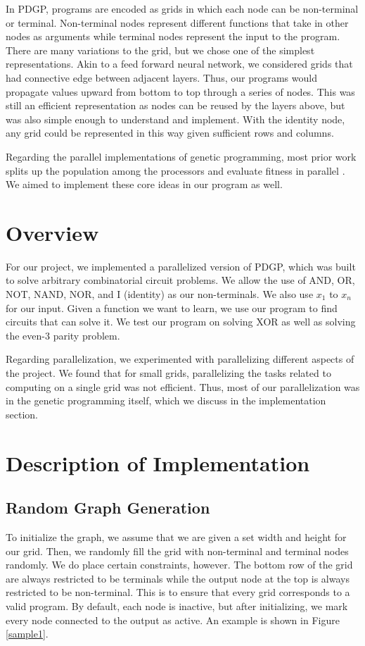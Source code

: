 \documentclass{article}
\begin{document}
	In PDGP, programs are encoded as grids in which each node can be non-terminal or terminal. Non-terminal nodes represent different functions that take in other nodes as arguments while terminal nodes represent the input to the program. There are many variations to the grid, but we chose one of the simplest representations. Akin to a feed forward neural network, we considered grids that had connective edge between adjacent layers. Thus, our programs would propagate values upward from bottom to top through a series of nodes. This was still an efficient representation as nodes can be reused by the layers above, but was also simple enough to understand and implement. With the identity node, any grid could be represented in this way given sufficient rows and columns.
	
	Regarding the parallel implementations of genetic programming, most prior work splits up the population among the processors and evaluate fitness in parallel \cite{b4}. We aimed to implement these core ideas in our program as well.
	
	
	\section{Overview}
	For our project, we implemented a parallelized version of PDGP, which was built to solve arbitrary combinatorial circuit problems. We allow the use of AND, OR, NOT, NAND, NOR, and I (identity) as our non-terminals. We also use $x_1$ to $x_n$ for our input. Given a function we want to learn, we use our program to find circuits that can solve it. We test our program on solving XOR as well as solving the even-3 parity problem. 
	
	Regarding parallelization, we experimented with parallelizing different aspects of the project. We found that for small grids, parallelizing the tasks related to computing on a single grid was not efficient. Thus, most of our parallelization was in the genetic programming itself, which we discuss in the implementation section.
	
	\section{Description of Implementation}

	\subsection{Random Graph Generation}
	To initialize the graph, we assume that we are given a set width and height for our grid. Then, we randomly fill the grid with non-terminal and terminal nodes randomly. We do place certain constraints, however. The bottom row of the grid are always restricted to be terminals while the output node at the top is always restricted to be non-terminal. This is to ensure that every grid corresponds to a valid program. By default, each node is inactive, but after initializing, we mark every node connected to the output as active. An example is shown in Figure \ref{sample1}.
	
\end{document}
